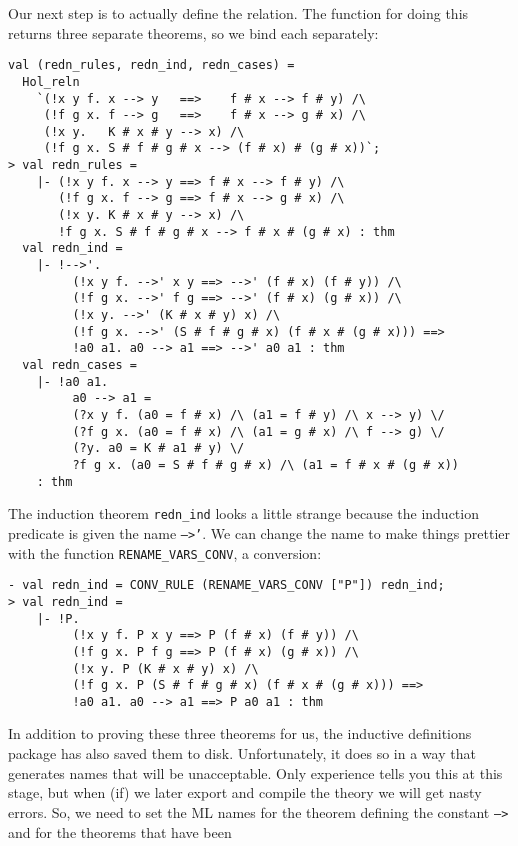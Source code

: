 Our next step is to actually define the relation.  The function for
doing this returns three separate theorems, so we bind each
separately:
\begin{session}\begin{verbatim}
val (redn_rules, redn_ind, redn_cases) =
  Hol_reln
    `(!x y f. x --> y   ==>    f # x --> f # y) /\
     (!f g x. f --> g   ==>    f # x --> g # x) /\
     (!x y.   K # x # y --> x) /\
     (!f g x. S # f # g # x --> (f # x) # (g # x))`;
> val redn_rules =
    |- (!x y f. x --> y ==> f # x --> f # y) /\
       (!f g x. f --> g ==> f # x --> g # x) /\
       (!x y. K # x # y --> x) /\
       !f g x. S # f # g # x --> f # x # (g # x) : thm
  val redn_ind =
    |- !-->'.
         (!x y f. -->' x y ==> -->' (f # x) (f # y)) /\
         (!f g x. -->' f g ==> -->' (f # x) (g # x)) /\
         (!x y. -->' (K # x # y) x) /\
         (!f g x. -->' (S # f # g # x) (f # x # (g # x))) ==>
         !a0 a1. a0 --> a1 ==> -->' a0 a1 : thm
  val redn_cases =
    |- !a0 a1.
         a0 --> a1 =
         (?x y f. (a0 = f # x) /\ (a1 = f # y) /\ x --> y) \/
         (?f g x. (a0 = f # x) /\ (a1 = g # x) /\ f --> g) \/
         (?y. a0 = K # a1 # y) \/
         ?f g x. (a0 = S # f # g # x) /\ (a1 = f # x # (g # x))
    : thm
\end{verbatim}\end{session}
    The induction theorem \texttt{redn\_ind} looks a little strange
    because the induction predicate is given the name \texttt{-->'}.
    We can change the name to make things prettier with the function
    \texttt{RENAME\_VARS\_CONV}, a conversion:
\begin{session}\begin{verbatim}
- val redn_ind = CONV_RULE (RENAME_VARS_CONV ["P"]) redn_ind;
> val redn_ind =
    |- !P.
         (!x y f. P x y ==> P (f # x) (f # y)) /\
         (!f g x. P f g ==> P (f # x) (g # x)) /\
         (!x y. P (K # x # y) x) /\
         (!f g x. P (S # f # g # x) (f # x # (g # x))) ==>
         !a0 a1. a0 --> a1 ==> P a0 a1 : thm
\end{verbatim}\end{session}
    In addition to proving these three theorems for us, the inductive
    definitions package has also saved them to disk.  Unfortunately,
    it does so in a way that generates names that will be
    unacceptable.  Only experience tells you this at this stage, but
    when (if) we later export and compile the theory we will get nasty
    errors.  So, we need to set the ML names for the theorem defining
    the constant \texttt{-->} and for the theorems that have been

